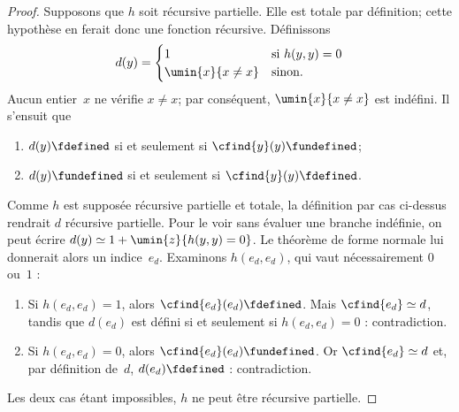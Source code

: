 \documentclass[../../../include/open-logic-section]{subfiles}
\begin{document}
\begin{proof}
Supposons que $h$ soit récursive partielle. Elle est totale
par définition; cette hypothèse en ferait donc une fonction
récursive. Définissons
\[
d(y) =
\begin{cases}
1 & \text{si $h(y, y) = 0$}\\
\umin{x}{x \neq x} & \text{sinon.}
\end{cases}
\]
Aucun entier~$x$ ne vérifie $x \neq x$; par conséquent,
$\umin{x}{x \neq x}$ est indéfini. Il s'ensuit que
\begin{enumerate}
\item $d(y) \fdefined$ si et seulement si
  $\cfind{y}(y) \fundefined$;
\item $d(y) \fundefined$ si et seulement si
  $\cfind{y}(y) \fdefined$.
\end{enumerate}
Comme $h$ est supposée récursive partielle et totale,
la définition par cas ci-dessus rendrait $d$ récursive
partielle. Pour le voir sans évaluer une branche indéfinie, on peut écrire $d(y)\simeq 1+\umin{z}{h(y,y)=0}$. Le théorème de forme normale lui donnerait
alors un indice~$e_d$. Examinons $h(e_d,e_d)$,
qui vaut nécessairement $0$ ou~$1$ :
\begin{enumerate}
\item Si $h(e_d,e_d)=1$, alors
  $\cfind{e_d}(e_d) \fdefined$. Mais
  $\cfind{e_d}\simeq d$, tandis que $d(e_d)$
  est défini si et seulement si $h(e_d,e_d)=0$ :
  contradiction.
\item Si $h(e_d,e_d)=0$, alors
  $\cfind{e_d}(e_d) \fundefined$. Or
  $\cfind{e_d}\simeq d$ et, par définition de~$d$,
  $d(e_d) \fdefined$ : contradiction.
\end{enumerate}
Les deux cas étant impossibles, $h$ ne peut être
récursive partielle.
\end{proof}
\end{document}
